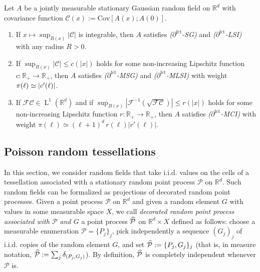 \documentclass[AHL,Unicode,longabstracts]{cedram}
\newcommand{\R}{\mathbb R}
\newcommand{\Cc}{\mathcal C}
\newcommand{\Pc}{\mathcal P}
\newcommand{\F}{\mathcal F}
\DeclareMathOperator{\Ld}{L}
\newcommand{\parfct}[1]{\partial_{#1}^{\operatorname{fct}}}
\newcommand{\cov}[2]{\mathrm{Cov}\left[#1;#2\right]}
\newcommand*{\romanenumi}{\renewcommand*{\theenumi}{\roman{enumi}}}
\renewcommand*{\hat}[1]{\mathchoice{\widehat{#1}}{\widehat{#1}}{\oldhat{#1}}{\oldhat{#1}}}\let\oldexists\exists
\renewcommand*{\exists}{\mathrel{\oldexists}}
\begin{document}
\begin{theo}\label{cor:gaussiansg}
Let $A$ be a jointly measurable stationary Gaussian random field on $\R^d$ with covariance function $\Cc(x):=\cov{A(x)}{A(0)}$.
\begin{enumerate}\romanenumi
\item \label{theo3.1.1}If $x\mapsto \sup_{B(x)}|\Cc|$ is integrable, then $A$ satisfies \emph{($\parfct{}$-SG)} and \emph{($\parfct{}$-LSI)} with any radius $R>0$.
\item \label{theo3.1.2}If $\sup_{B(x)}|\Cc| \le c(|x|)$ holds for some non-increasing Lipschitz function\linebreak$c:\R_+\to\R_+$, then $A$ satisfies \emph{($\parfct{}$-MSG)} and \emph{($\parfct{}$-MLSI)} with weight $\pi(\ell)\linebreak\simeq |c'(\ell)|$.
\item \label{theo3.1.3}If $\F\Cc\in\Ld^1(\R^d)$ and if $\sup_{B(x)}|\F^{-1}(\sqrt{\F\Cc})|\le r(|x|)$ holds for some non-increasing Lipschitz function $r:\R_+\to\R_+$, then $A$ satisfies \emph{($\parfct{}$-MCI)} with weight $\pi(\ell)\simeq (\ell+1)^d\,r(\ell)|r'(\ell)|$.
\qedhere
\end{enumerate}
\end{theo}

\subsection{Poisson random tessellations}\label{chap:tessel}
In this section, we consider random fields that take i.i.d. values on the cells of a tessellation associated with a stationary random point process $\Pc$ on $\R^d$. Such random fields can be formalized as projections of decorated random point processes. Given a point process $\Pc$ on $\R^d$ and given a random element $G$ with values in some measurable space $X$, we call \emph{decorated random point process associated with $\Pc$ and $G$} a point process $\hat\Pc$ on $\R^d\times X$ defined as follows: choose a measurable enumeration $\Pc=\{P_j\}_j$, pick independently a sequence $(G_j)_j$ of i.i.d. copies of the random element $G$, and set $\hat\Pc:=\{P_j,G_j\}_j$ (that is, in measure notation, $\hat\Pc:=\sum_j\delta_{(P_j,G_j)}$). By definition, $\hat\Pc$ is completely independent whenever $\Pc$ is.

\end{document}
